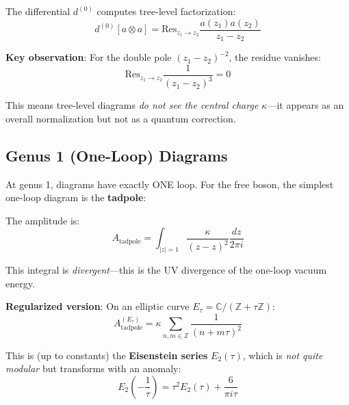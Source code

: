 The differential $d^{(0)}$ computes tree-level factorization:
\begin{equation}
d^{(0)}[a \otimes a] = \text{Res}_{z_1 \to z_2} \frac{a(z_1) a(z_2)}{z_1 - z_2}
\end{equation}

\textbf{Key observation}: For the double pole $(z_1-z_2)^{-2}$, the residue vanishes:
\begin{equation}
\text{Res}_{z_1 \to z_2} \frac{1}{(z_1-z_2)^3} = 0
\end{equation}

This means tree-level diagrams \emph{do not see the central charge $\kappa$}---it appears as an overall normalization but not as a quantum correction.

\subsection{Genus 1 (One-Loop) Diagrams}

At genus 1, diagrams have exactly ONE loop. For the free boson, the simplest one-loop diagram is the \textbf{tadpole}:

\begin{center}
\end{center}

The amplitude is:
\begin{equation}
A_{\text{tadpole}} = \int_{|z|=1} \frac{\kappa}{(z-z)^2} \frac{dz}{2\pi i}
\end{equation}

This integral is \emph{divergent}---this is the UV divergence of the one-loop vacuum energy.

\textbf{Regularized version}: On an elliptic curve $E_\tau = \mathbb{C}/(\mathbb{Z} + \tau\mathbb{Z})$:
\begin{equation}
A_{\text{tadpole}}^{(E_\tau)} = \kappa \sum_{n,m \in \mathbb{Z}} \frac{1}{(n + m\tau)^2}
\end{equation}

This is (up to constants) the \textbf{Eisenstein series} $E_2(\tau)$, which is \emph{not quite modular} but transforms with an anomaly:
\begin{equation}
E_2\left(-\frac{1}{\tau}\right) = \tau^2 E_2(\tau) + \frac{6}{\pi i \tau}
\end{equation}

